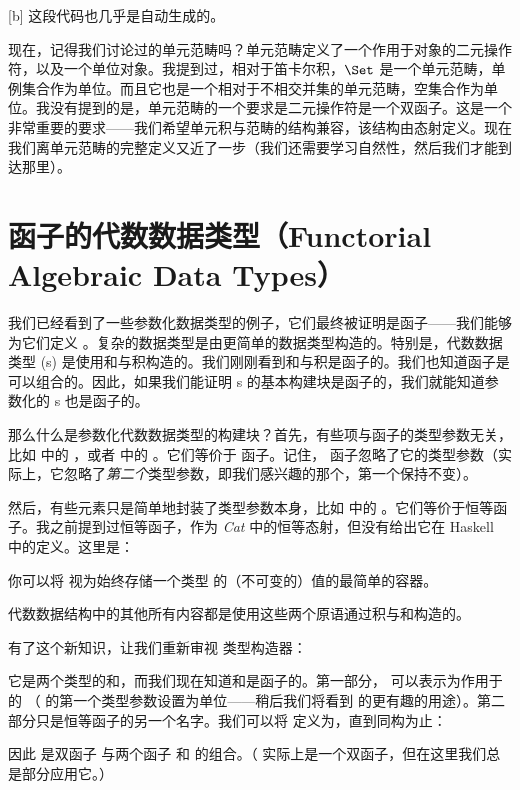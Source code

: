 [b]
这段代码也几乎是自动生成的。

现在，记得我们讨论过的单元范畴吗？单元范畴定义了一个作用于对象的二元操作符，以及一个单位对象。我提到过，相对于笛卡尔积，$\Set$ 是一个单元范畴，单例集合作为单位。而且它也是一个相对于不相交并集的单元范畴，空集合作为单位。我没有提到的是，单元范畴的一个要求是二元操作符是一个双函子。这是一个非常重要的要求——我们希望单元积与范畴的结构兼容，该结构由态射定义。现在我们离单元范畴的完整定义又近了一步（我们还需要学习自然性，然后我们才能到达那里）。

\section{函子的代数数据类型（Functorial Algebraic Data Types）}

我们已经看到了一些参数化数据类型的例子，它们最终被证明是函子——我们能够为它们定义 。复杂的数据类型是由更简单的数据类型构造的。特别是，代数数据类型 (s) 是使用和与积构造的。我们刚刚看到和与积是函子的。我们也知道函子是可以组合的。因此，如果我们能证明 s 的基本构建块是函子的，我们就能知道参数化的 s 也是函子的。

那么什么是参数化代数数据类型的构建块？首先，有些项与函子的类型参数无关，比如  中的 ，或者  中的 。它们等价于  函子。记住， 函子忽略了它的类型参数（实际上，它忽略了\emph{第二个}类型参数，即我们感兴趣的那个，第一个保持不变）。

然后，有些元素只是简单地封装了类型参数本身，比如  中的 。它们等价于恒等函子。我之前提到过恒等函子，作为 \emph{Cat} 中的恒等态射，但没有给出它在 Haskell 中的定义。这里是：


你可以将  视为始终存储一个类型  的（不可变的）值的最简单的容器。

代数数据结构中的其他所有内容都是使用这些两个原语通过积与和构造的。

有了这个新知识，让我们重新审视  类型构造器：

它是两个类型的和，而我们现在知道和是函子的。第一部分， 可以表示为作用于  的 （ 的第一个类型参数设置为单位——稍后我们将看到  的更有趣的用途）。第二部分只是恒等函子的另一个名字。我们可以将  定义为，直到同构为止：

因此  是双函子  与两个函子  和  的组合。（ 实际上是一个双函子，但在这里我们总是部分应用它。）

